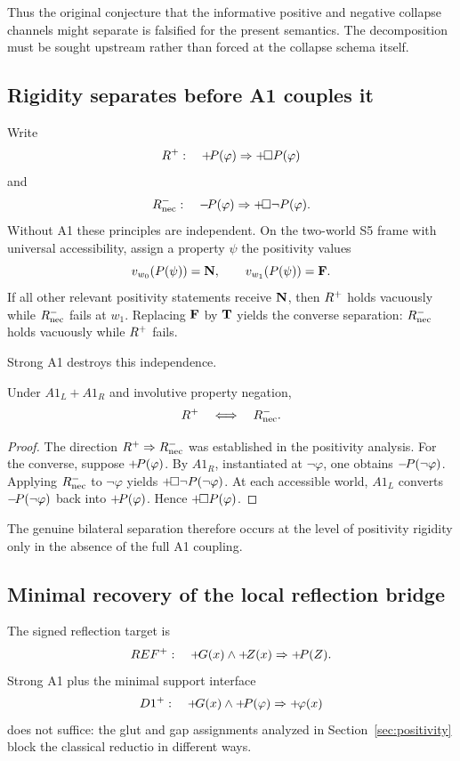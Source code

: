 Thus the original conjecture that the informative positive and negative collapse channels might separate is falsified for the present semantics. The decomposition must be sought upstream rather than forced at the collapse schema itself.

\subsection{Rigidity separates before A1 couples it}

Write
\[
  R^{+}:\quad +\!P(\varphi)\Rightarrow+\!\Box P(\varphi)
\]
and
\[
  R^{-}_{\mathrm{nec}}:\quad -\!P(\varphi)\Rightarrow+\!\Box\neg P(\varphi).
\]
Without A1 these principles are independent. On the two-world S5 frame with universal accessibility, assign a property \(\psi\) the positivity values
\[
  v_{w_0}(P(\psi))=\mathbf{N},
  \qquad
  v_{w_1}(P(\psi))=\mathbf{F}.
\]
If all other relevant positivity statements receive \(\mathbf{N}\), then \(R^{+}\) holds vacuously while \(R^{-}_{\mathrm{nec}}\) fails at \(w_1\). Replacing \(\mathbf{F}\) by \(\mathbf{T}\) yields the converse separation: \(R^{-}_{\mathrm{nec}}\) holds vacuously while \(R^{+}\) fails.

Strong A1 destroys this independence.

\begin{proposition}
Under \(A1_L+A1_R\) and involutive property negation,
\[
  R^{+}\quad\Longleftrightarrow\quad R^{-}_{\mathrm{nec}}.
\]
\end{proposition}
\begin{proof}
The direction \(R^{+}\Rightarrow R^{-}_{\mathrm{nec}}\) was established in the positivity analysis. For the converse, suppose \(+\!P(\varphi)\). By \(A1_R\), instantiated at \(\neg\varphi\), one obtains \(-\!P(\neg\varphi)\). Applying \(R^{-}_{\mathrm{nec}}\) to \(\neg\varphi\) yields \(+\!\Box\neg P(\neg\varphi)\). At each accessible world, \(A1_L\) converts \(-\!P(\neg\varphi)\) back into \(+\!P(\varphi)\). Hence \(+\!\Box P(\varphi)\).
\end{proof}

The genuine bilateral separation therefore occurs at the level of positivity rigidity only in the absence of the full A1 coupling.

\subsection{Minimal recovery of the local reflection bridge}

The signed reflection target is
\[
  REF^+:\quad +\!G(x)\land+\!Z(x)\Rightarrow+\!P(Z).
\]
Strong A1 plus the minimal support interface
\[
  D1^+:\quad
  +\!G(x)\land+\!P(\varphi)\Rightarrow+\!\varphi(x)
\]
does not suffice: the glut and gap assignments analyzed in Section~\ref{sec:positivity} block the classical reductio in different ways.

